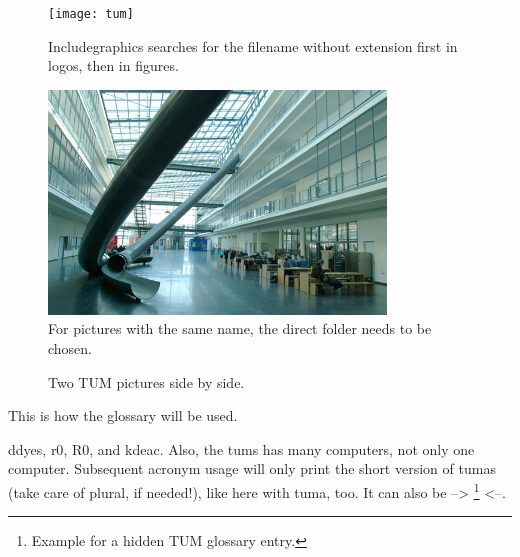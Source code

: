 \begin{figure}[htpb]
  \centering
  \texttt{[image: tum]}
  \caption[Something else can be written here for listing this, otherwise the caption will be written!]{Includegraphics searches for the filename without extension first in logos, then in figures.} \label{fig:tum}
\end{figure}

\begin{figure}[htpb]
  \centering
  \includegraphics[width=0.8\textwidth]{figures/tum}
  \caption{For pictures with the same name, the direct folder needs to be chosen.} \label{fig:tumslide}
\end{figure}

\begin{figure}[!tbp]
  \centering
  \hfill
  \caption{Two TUM pictures side by side.}
  \label{fig:sidebyside}
\end{figure}

This is how the glossary will be used.

\Glspl{ddye}, \gls{r0}, \gls{R0}, and \gls{kdeac}. Also, the \glspl{tum} has many \glspl{computer}, not only one \Gls{computer}. Subsequent acronym usage will only print the short version of \glspl{tuma} (take care of plural, if needed!), like here with \gls{tuma}, too. It can also be --> \footnote{Example for a hidden TUM glossary entry.} <--.


\fi
